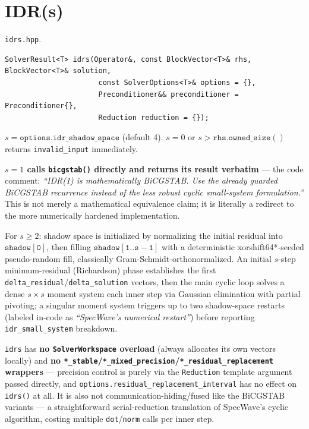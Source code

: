 \documentclass[11pt,a4paper]{report}
\begin{document}
\section{IDR(s)}
\label{sec:5.6}

\texttt{idrs.hpp}.

\begin{lstlisting}
SolverResult<T> idrs(Operator&, const BlockVector<T>& rhs, BlockVector<T>& solution,
                      const SolverOptions<T>& options = {},
                      Preconditioner&& preconditioner = Preconditioner{},
                      Reduction reduction = {});
\end{lstlisting}

$s = \mathtt{options.idr\_shadow\_space}$ (default 4). $s=0$ or
$s > \mathtt{rhs.owned\_size()}$ returns \lstinline!invalid_input! immediately.

\textbf{$s=1$ calls \lstinline!bicgstab()! directly and returns its result
verbatim} --- the code comment: \emph{``IDR(1) is mathematically
BiCGSTAB. Use the already guarded BiCGSTAB recurrence instead of the
less robust cyclic small-system formulation.''} This is not merely a
mathematical equivalence claim; it is literally a redirect to the more
numerically hardened implementation.

For $s \geq 2$: shadow space is initialized by normalizing the initial
residual into $\mathtt{shadow[0]}$, then filling $\mathtt{shadow[1..s-1]}$
with a deterministic xorshift64*-seeded pseudo-random fill, classically
Gram-Schmidt-orthonormalized. An initial $s$-step minimum-residual
(Richardson) phase establishes the first
\lstinline!delta_residual!/\lstinline!delta_solution! vectors, then the main cyclic
loop solves a dense $s\times s$ moment system each inner step via
Gaussian elimination with partial pivoting; a singular moment system
triggers up to two shadow-space restarts (labeled in-code as
\emph{``SpecWave's numerical restart''}) before reporting
\lstinline!idr_small_system! breakdown.

\lstinline!idrs! has \textbf{no \lstinline!SolverWorkspace! overload} (always
allocates its own vectors locally) and \textbf{no \lstinline!*_stable!/\lstinline!*_mixed_precision!/\lstinline!*_residual_replacement!
wrappers} --- precision control is purely via the \lstinline!Reduction!
template argument passed directly, and
\lstinline!options.residual_replacement_interval! has no effect on \lstinline!idrs()!
at all. It is also not communication-hiding/fused like the BiCGSTAB
variants --- a straightforward serial-reduction translation of
SpecWave's cyclic algorithm, costing multiple \lstinline!dot!/\lstinline!norm! calls
per inner step.
\end{document}
